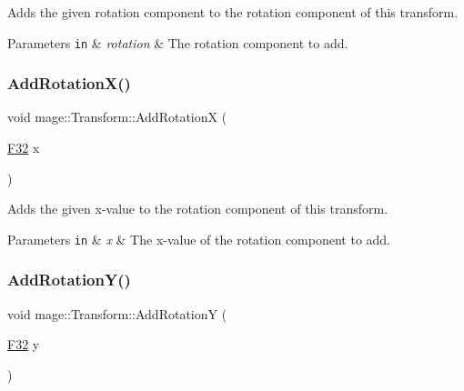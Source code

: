 Adds the given rotation component to the rotation component of this transform.


\begin{DoxyParams}[1]{Parameters}
\mbox{\tt in}  & {\em rotation} & The rotation component to add. \\
\hline
\end{DoxyParams}
\hypertarget{structmage_1_1_transform_a920bcbc350d3896bd1d8f9f6233cc008}{}\label{structmage_1_1_transform_a920bcbc350d3896bd1d8f9f6233cc008} 
\subsubsection{\texorpdfstring{Add\+Rotation\+X()}{AddRotationX()}}
{\footnotesize\ttfamily void mage\+::\+Transform\+::\+Add\+RotationX (\begin{DoxyParamCaption}\item[{\hyperlink{namespacemage_aa97e833b45f06d60a0a9c4fc22ae02c0}{F32}}]{x }\end{DoxyParamCaption})\hspace{0.3cm}{\ttfamily [noexcept]}}

Adds the given x-\/value to the rotation component of this transform.


\begin{DoxyParams}[1]{Parameters}
\mbox{\tt in}  & {\em x} & The x-\/value of the rotation component to add. \\
\hline
\end{DoxyParams}
\hypertarget{structmage_1_1_transform_ab9e20e922cd6e651a984480aa0aa6752}{}\label{structmage_1_1_transform_ab9e20e922cd6e651a984480aa0aa6752} 
\subsubsection{\texorpdfstring{Add\+Rotation\+Y()}{AddRotationY()}}
{\footnotesize\ttfamily void mage\+::\+Transform\+::\+Add\+RotationY (\begin{DoxyParamCaption}\item[{\hyperlink{namespacemage_aa97e833b45f06d60a0a9c4fc22ae02c0}{F32}}]{y }\end{DoxyParamCaption})\hspace{0.3cm}{\ttfamily [noexcept]}}

